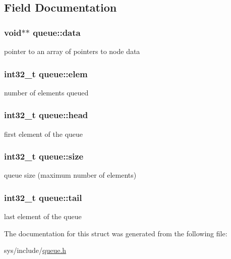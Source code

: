 \subsection{Field Documentation}
\hypertarget{structqueue_a794929032d575599c02f795cea4b3118}{
\subsubsection[{data}]{\setlength{\rightskip}{0pt plus 5cm}void$\ast$$\ast$ queue\-::data}}\label{structqueue_a794929032d575599c02f795cea4b3118}
pointer to an array of pointers to node data \hypertarget{structqueue_a187a42d061b48da53e894181758d558d}{
\subsubsection[{elem}]{\setlength{\rightskip}{0pt plus 5cm}int32\-\_\-t queue\-::elem}}\label{structqueue_a187a42d061b48da53e894181758d558d}
number of elements queued \hypertarget{structqueue_aec96f7889213946d685f28a0d6504428}{
\subsubsection[{head}]{\setlength{\rightskip}{0pt plus 5cm}int32\-\_\-t queue\-::head}}\label{structqueue_aec96f7889213946d685f28a0d6504428}
first element of the queue \hypertarget{structqueue_af80cfabc36286195365b6d666d518504}{
\subsubsection[{size}]{\setlength{\rightskip}{0pt plus 5cm}int32\-\_\-t queue\-::size}}\label{structqueue_af80cfabc36286195365b6d666d518504}
queue size (maximum number of elements) \hypertarget{structqueue_ada0fe9a078df1d07623c761f2e8376ad}{
\subsubsection[{tail}]{\setlength{\rightskip}{0pt plus 5cm}int32\-\_\-t queue\-::tail}}\label{structqueue_ada0fe9a078df1d07623c761f2e8376ad}
last element of the queue 

The documentation for this struct was generated from the following file\-:\begin{DoxyCompactItemize}
\item 
sys/include/\hyperlink{queue_8h}{queue.\-h}\end{DoxyCompactItemize}
